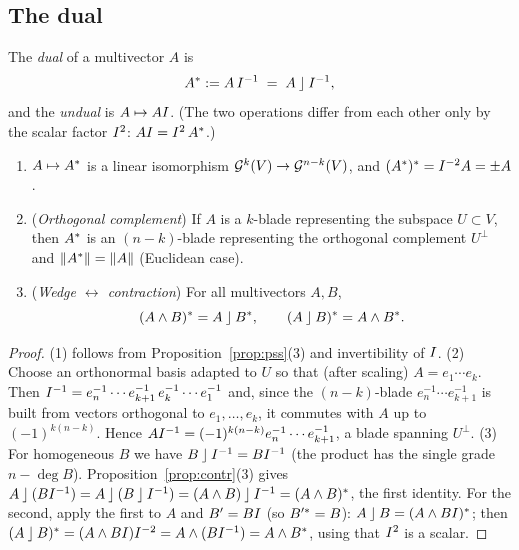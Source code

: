 \subsection{The dual}

\begin{definition}\label{def:dual}
The \emph{dual} of a multivector $A$ is
\[
 A^{\ast}:=A\,I^{-1}\;=\;A\mathbin{\rfloor}I^{-1},
\]
and the \emph{undual} is $A\mapsto AI$. (The two operations differ from each other only by the scalar factor $I^{2}$: $AI=I^2\,A^{\ast}$.)
\end{definition}

\begin{theorem}\label{thm:dual}
\begin{enumerate}
  \item $A\mapsto A^{\ast}$ is a linear isomorphism $\mathcal{G}^k(V)\to\mathcal{G}^{n-k}(V)$, and $(A^{\ast})^{\ast}=I^{-2}A=\pm A$.
  \item (\emph{Orthogonal complement}) If $A$ is a $k$-blade representing the subspace $U\subset V$, then $A^{\ast}$ is an $(n-k)$-blade representing the orthogonal complement $U^\perp$ and $\left\lVert A^{\ast}\right\rVert=\left\lVert A\right\rVert$ (Euclidean case).
  \item (\emph{Wedge $\leftrightarrow$ contraction}) For all multivectors $A,B$,
  \begin{equation}\label{eq:dualduality}
   (A\wedge B)^{\ast}=A\mathbin{\rfloor}B^{\ast},\qquad (A\mathbin{\rfloor} B)^{\ast}=A\wedge B^{\ast} .
  \end{equation}
\end{enumerate}
\end{theorem}
\begin{proof}
(1) follows from Proposition~\ref{prop:pss}(3) and invertibility of $I$.
(2) Choose an orthonormal basis adapted to $U$ so that (after scaling) $A=e_1\cdots e_k$. Then $I^{-1}=e_n^{-1}\cdots e_{k+1}^{-1}\,e_k^{-1}\cdots e_1^{-1}$ and, since the $(n-k)$-blade $e_n^{-1}\cdots e_{k+1}^{-1}$ is built from vectors orthogonal to $e_1,\dots,e_k$, it commutes with $A$ up to $(-1)^{k(n-k)}$. Hence $AI^{-1}=(-1)^{k(n-k)}e_n^{-1}\cdots e_{k+1}^{-1}$, a blade spanning $U^\perp$.
(3) For homogeneous $B$ we have $B\mathbin{\rfloor}I^{-1}=BI^{-1}$ (the product has the single grade $n-\deg B$). Proposition~\ref{prop:contr}(3) gives
$A\mathbin{\rfloor}(BI^{-1})=A\mathbin{\rfloor}(B\mathbin{\rfloor}I^{-1})=(A\wedge B)\mathbin{\rfloor}I^{-1}=(A\wedge B)^{\ast}$, the first identity. For the second, apply the first to $A$ and $B'=BI$ (so $B'^{\ast}=B$): $A\mathbin{\rfloor} B=(A\wedge BI)^{\ast}$; then $(A\mathbin{\rfloor} B)^{\ast}=(A\wedge BI)I^{-2}=A\wedge(BI^{-1})=A\wedge B^{\ast}$, using that $I^{2}$ is a scalar.
\end{proof}

